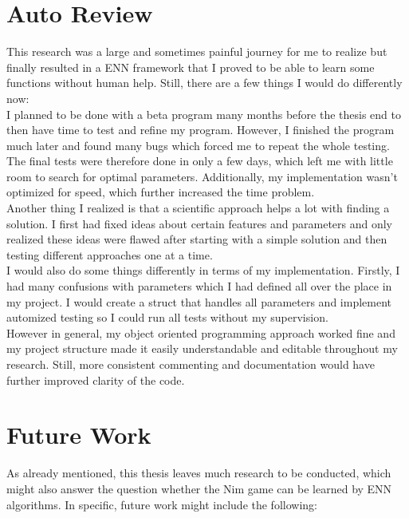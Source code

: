 \section{Auto Review}\label{sec:auto-review}
This research was a large and sometimes painful journey for me to realize but finally resulted in a ENN framework that I proved to be able to learn some functions without human help.
Still, there are a few things I would do differently now:
\\
I planned to be done with a beta program many months before the thesis end to then have time to test and refine my program.
However, I finished the program much later and found many bugs which forced me to repeat the whole testing.
The final tests were therefore done in only a few days, which left me with little room to search for optimal parameters.
Additionally, my implementation wasn't optimized for speed, which further increased the time problem.
\\
Another thing I realized is that a scientific approach helps a lot with finding a solution.
I first had fixed ideas about certain features and parameters and only realized these ideas were flawed after starting with a simple solution and then testing different approaches one at a time.
\\
I would also do some things differently in terms of my implementation.
Firstly, I had many confusions with parameters which I had defined all over the place in my project.
I would create a struct that handles all parameters and implement automized testing so I could run all tests without my supervision.
\\
However in general, my object oriented programming approach worked fine and my project structure made it easily understandable and editable throughout my research.
Still, more consistent commenting and documentation would have further improved clarity of the code.


\section{Future Work}\label{sec:future-work}
As already mentioned, this thesis leaves much research to be conducted, which might also answer the question whether the Nim game can be learned by ENN algorithms.
In specific, future work might include the following:

